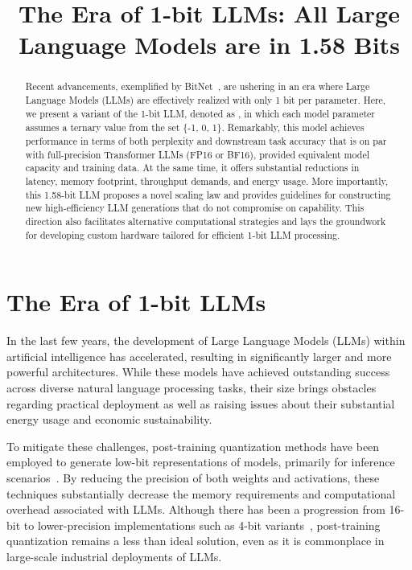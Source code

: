 \title{The Era of 1-bit LLMs: All Large Language Models are in 1.58 Bits}

\begin{abstract}
Recent advancements, exemplified by BitNet~\cite{bitnet}, are ushering in an era where Large Language Models (LLMs) are effectively realized with only 1 bit per parameter. Here, we present a variant of the 1-bit LLM, denoted as \textbf{}, in which each model parameter assumes a ternary value from the set \{-1, 0, 1\}. Remarkably, this model achieves performance in terms of both perplexity and downstream task accuracy that is on par with full-precision Transformer LLMs (FP16 or BF16), provided equivalent model capacity and training data. At the same time, it offers substantial reductions in latency, memory footprint, throughput demands, and energy usage. More importantly, this 1.58-bit LLM proposes a novel scaling law and provides guidelines for constructing new high-efficiency LLM generations that do not compromise on capability. This direction also facilitates alternative computational strategies and lays the groundwork for developing custom hardware tailored for efficient 1-bit LLM processing.
\end{abstract}

\section{The Era of 1-bit LLMs}

In the last few years, the development of Large Language Models (LLMs) within artificial intelligence has accelerated, resulting in significantly larger and more powerful architectures. While these models have achieved outstanding success across diverse natural language processing tasks, their size brings obstacles regarding practical deployment as well as raising issues about their substantial energy usage and economic sustainability.

To mitigate these challenges, post-training quantization methods have been employed to generate low-bit representations of models, primarily for inference scenarios~\cite{smoothquant, gptq, quip, quip_sharp}. By reducing the precision of both weights and activations, these techniques substantially decrease the memory requirements and computational overhead associated with LLMs. Although there has been a progression from 16-bit to lower-precision implementations such as 4-bit variants~\cite{gptq, awq}, post-training quantization remains a less than ideal solution, even as it is commonplace in large-scale industrial deployments of LLMs.

